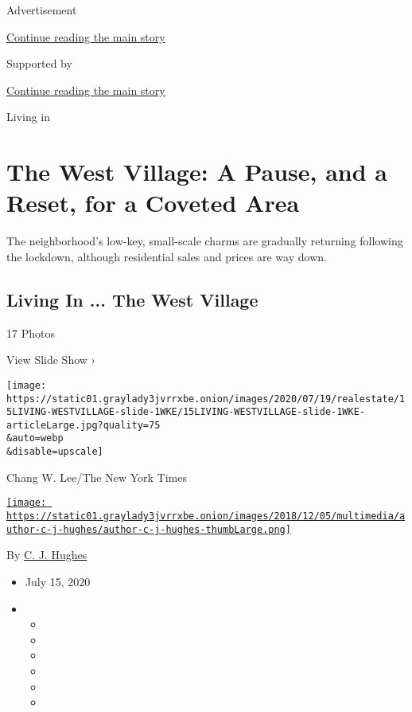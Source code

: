 Advertisement

\protect\hyperlink{after-top}{Continue reading the main story}

Supported by

\protect\hyperlink{after-sponsor}{Continue reading the main story}

Living in

\hypertarget{the-west-village-a-pause-and-a-reset-for-a-coveted-area}{%
\section{The West Village: A Pause, and a Reset, for a Coveted
Area}\label{the-west-village-a-pause-and-a-reset-for-a-coveted-area}}

The neighborhood's low-key, small-scale charms are gradually returning
following the lockdown, although residential sales and prices are way
down.

\href{https://www.nytimes3xbfgragh.onion/slideshow/2020/07/15/realestate/living-in-the-west-village.html}{}

\hypertarget{living-in--the-west-village}{%
\subsection{Living In ... The West
Village}\label{living-in--the-west-village}}

17 Photos

View Slide Show ›

\texttt{[image: https://static01.graylady3jvrrxbe.onion/images/2020/07/19/realestate/15LIVING-WESTVILLAGE-slide-1WKE/15LIVING-WESTVILLAGE-slide-1WKE-articleLarge.jpg?quality=75\\\&auto=webp\\\&disable=upscale]}

Chang W. Lee/The New York Times

\href{https://www.nytimes3xbfgragh.onion/by/c-j-hughes}{\texttt{[image: https://static01.graylady3jvrrxbe.onion/images/2018/12/05/multimedia/author-c-j-hughes/author-c-j-hughes-thumbLarge.png]}}

By \href{https://www.nytimes3xbfgragh.onion/by/c-j-hughes}{C. J. Hughes}

\begin{itemize}
\item
  July 15, 2020
\item
  \begin{itemize}
  \item
  \item
  \item
  \item
  \item
  \item
  \end{itemize}
\end{itemize}

